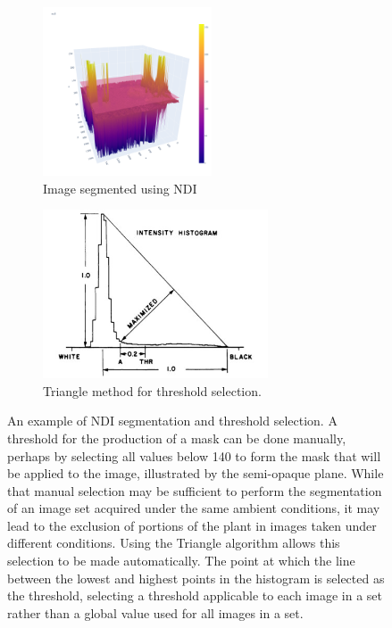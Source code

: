 \documentclass[letterpaper]{article}
\begin{document}
{{\begin{figure}[h!]
	\centering
	\begin{subfigure}[h]{.48\textwidth}
	  \centering
	  \includegraphics[height=5cm]{./figures/ndi-1-of-2.png}
	  \caption{Image segmented using NDI}
	  \label{fig:ndi-1}
	\end{subfigure}
	\hfill
	\begin{subfigure}[h]{.48\textwidth}
	  \centering
	  \includegraphics[height=5cm]{./figures/triangle-algorithm}
	  \caption{Triangle method for threshold selection.}
	  \label{fig:ndi-2}
	\end{subfigure}
	\caption[NDI segmentation and threshold selection]{An example of NDI segmentation and threshold selection. A threshold for the production of a mask can be done manually, perhaps by selecting all values below 140 to form the mask that will be applied to the image, illustrated by the semi-opaque plane. While that manual selection may be sufficient to perform the segmentation of an image set acquired under the same ambient conditions, it may lead to the exclusion of portions of the plant in images taken under different conditions. Using the Triangle algorithm \parencite{Brink1996-xy,Zack1977-yl} allows this selection to be made automatically. The point at which the line between the lowest and highest points in the histogram is selected as the threshold, selecting a threshold applicable to each image in a set rather than a global value used for all images in a set.}
	\label{fig:ndi-segmentation}
\end{figure}



}}
\end{document}

